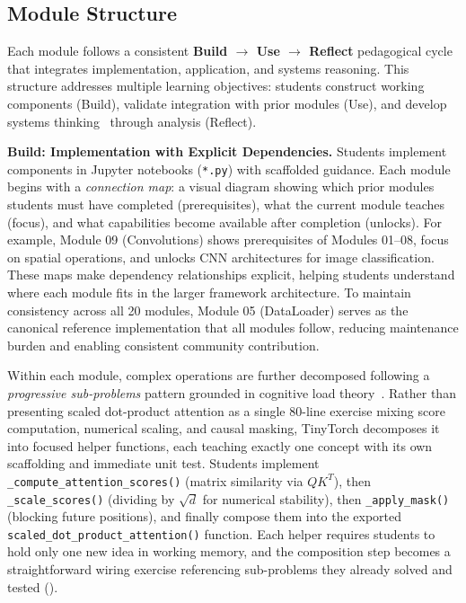 \documentclass[10pt,twocolumn]{article}
\begin{document}
\subsection{Module Structure}
\label{subsec:module-pedagogy}

Each module follows a consistent \textbf{Build $\rightarrow$ Use $\rightarrow$ Reflect} pedagogical cycle that integrates implementation, application, and systems reasoning. This structure addresses multiple learning objectives: students construct working components (Build), validate integration with prior modules (Use), and develop systems thinking~\citep{meadows2008thinking} through analysis (Reflect).

\textbf{Build: Implementation with Explicit Dependencies.} Students implement components in Jupyter notebooks (\texttt{*.py}) with scaffolded guidance. Each module begins with a \emph{connection map}: a visual diagram showing which prior modules students must have completed (prerequisites), what the current module teaches (focus), and what capabilities become available after completion (unlocks). For example, Module 09 (Convolutions) shows prerequisites of Modules 01--08, focus on spatial operations, and unlocks CNN architectures for image classification. These maps make dependency relationships explicit, helping students understand where each module fits in the larger framework architecture. To maintain consistency across all 20 modules, Module 05 (DataLoader) serves as the canonical reference implementation that all modules follow, reducing maintenance burden and enabling consistent community contribution.

Within each module, complex operations are further decomposed following a \emph{progressive sub-problems} pattern grounded in cognitive load theory~\citep{sweller1988}. Rather than presenting scaled dot-product attention as a single 80-line exercise mixing score computation, numerical scaling, and causal masking, TinyTorch decomposes it into focused helper functions, each teaching exactly one concept with its own scaffolding and immediate unit test. Students implement \texttt{\_compute\_attention\_scores()} (matrix similarity via $QK^T$), then \texttt{\_scale\_scores()} (dividing by $\sqrt{d}$ for numerical stability), then \texttt{\_apply\_mask()} (blocking future positions), and finally compose them into the exported \texttt{scaled\_dot\_product\_attention()} function. Each helper requires students to hold only one new idea in working memory, and the composition step becomes a straightforward wiring exercise referencing sub-problems they already solved and tested ().
\end{document}
